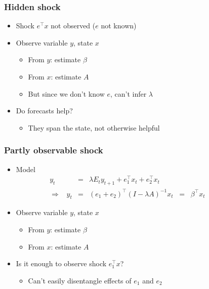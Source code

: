 \documentclass{beamer}
\begin{document}
\begin{frame}
\frametitle{Hidden shock}
\begin{itemize}  \itemsep=\bigskipamount
\item Shock $e^\top x$ not observed ($e$ not known)
\item Observe variable $y$, state $x$ \\
\begin{itemize}
\item From $y$:  estimate $\beta$
\item From $x$:  estimate $A$
\item But since we don't know $e$, can't infer $\lambda$
\end{itemize}
\item Do forecasts help? \\
\begin{itemize}
\item They span the state, not otherwise helpful
\end{itemize}
\end{itemize}
\end{frame}

\begin{frame}
\frametitle{Partly observable shock}
\begin{itemize}  \itemsep=\bigskipamount
\item Model
\begin{eqnarray*}
    y_t &=& \lambda E_t y_{t+1} + e_1^\top x_{t} + e_2^\top x_{t}
    \\
   \Rightarrow  \;\;\;
    y_t &=&  (e_1+e_2)^\top (I-\lambda A)^{-1} x_t \;\;=\;\; \beta^\top x_t
    \phantom{xxxxx}
\end{eqnarray*}
\item Observe variable $y$, state $x$ \\
\begin{itemize}
\item From $y$:  estimate $\beta$
\item From $x$:  estimate $A$
\end{itemize}
\item Is it enough to observe shock $e_1^\top x$?  \\
\begin{itemize}
\item Can't easily disentangle effects of $e_1$ and $e_2$ \\
\end{itemize}
\end{itemize}
\end{frame}
\end{document}
